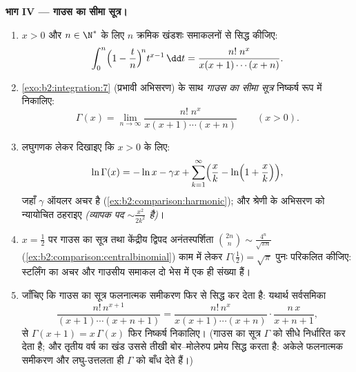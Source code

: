 \begin{problem}
\medskip
\noindent\textbf{भाग IV --- गाउस का सीमा सूत्र।}
\begin{enumerate}[resume]
  \item $x > 0$ और $n \in \N^*$ के लिए $n$ क्रमिक खंडशः समाकलनों से सिद्ध कीजिए:
        \[
        \int_0^n \Bigl(1 - \frac tn\Bigr)^{\!n} t^{x-1}\,\dd t
        = \frac{n!\;n^x}{x(x+1)\cdots(x+n)} .
        \]
  \item \cref{exo:b2:integration:7} (प्रभावी अभिसरण) के साथ \emph{गाउस का सीमा सूत्र} निष्कर्ष
        रूप में निकालिए:
        \[
        \Gamma(x) = \lim_{n\to\infty}
        \frac{n!\;n^x}{x(x+1)\cdots(x+n)}
        \qquad (x > 0).
        \]
  \item लघुगणक लेकर दिखाइए कि $x > 0$ के लिए:
        \[
        \ln\Gamma(x) = -\ln x - \gamma x +
        \sum_{k=1}^{\infty}\Bigl(\frac xk -
        \ln\Bigl(1 + \frac xk\Bigr)\Bigr),
        \]
        जहाँ $\gamma$ ऑयलर अचर है (\cref{ex:b2:comparison:harmonic}); और श्रेणी के अभिसरण को न्यायोचित
        ठहराइए \emph{(व्यापक पद $\sim \frac{x^2}{2k^2}$ है)}।
  \item $x = \frac12$ पर गाउस का सूत्र तथा केंद्रीय द्विपद अनंतस्पर्शिता $\binom{2n}{n} \sim
        \frac{4^n}{\sqrt{\pi n}}$
        (\cref{ex:b2:comparison:centralbinomial}) काम में लेकर $\Gamma\bigl(\frac12\bigr) = \sqrt\pi$ पुनः परिकलित कीजिए: स्टर्लिंग का अचर
        और गाउसीय समाकल दो भेस में एक ही संख्या हैं।
  \item जाँचिए कि गाउस का सूत्र फलनात्मक समीकरण फिर से सिद्ध कर देता है:
        यथार्थ सर्वसमिका
        \[
        \frac{n!\,n^{x+1}}{(x+1)\cdots(x+n+1)}
        = \frac{n!\,n^{x}}{x(x+1)\cdots(x+n)}\cdot
        \frac{n\,x}{x+n+1},
        \]
        से $\Gamma(x+1) = x\,\Gamma(x)$ फिर निष्कर्ष निकालिए। (गाउस का सूत्र $\Gamma$ को सीधे
        निर्धारित कर देता है; और तृतीय वर्ष का खंड उससे तीखी
        बोर--मोलेरुप प्रमेय सिद्ध करता है: अकेले फलनात्मक समीकरण और
        लघु-उत्तलता ही $\Gamma$ को बाँध देते हैं।)
\end{enumerate}


\end{problem}

